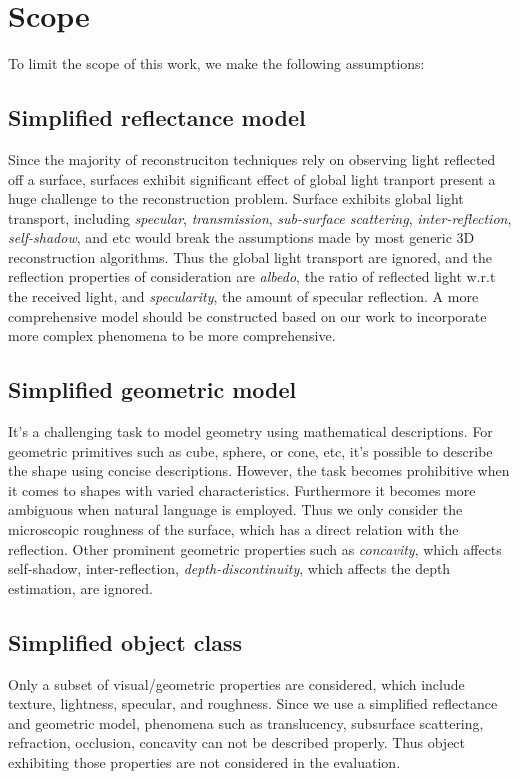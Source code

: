 \section{Scope}
To limit the scope of this work, we make the following assumptions:

\subsection{Simplified reflectance model}
Since the majority of reconstruciton techniques rely on observing light reflected off a surface, surfaces exhibit significant effect of global light tranport present a huge challenge to the reconstruction problem. Surface exhibits global light transport, including \textit{specular}, \textit{transmission}, \textit{sub-surface scattering}, \textit{inter-reflection}, \textit{self-shadow}, and etc would break the assumptions made by most generic 3D reconstruction algorithms. Thus the global light transport are ignored, and the reflection properties of consideration are \textit{albedo}, \ie the ratio of reflected light w.r.t the received light, and \textit{specularity}, \ie the amount of specular reflection. A more comprehensive model should be constructed based on our work to incorporate more complex phenomena to be more comprehensive.

\subsection{Simplified geometric model}
It's a challenging task to model geometry using mathematical descriptions. For geometric primitives such as cube, sphere, or cone, etc, it's possible to describe the shape using concise descriptions. However, the task becomes prohibitive when it comes to shapes with varied characteristics. Furthermore it becomes more ambiguous when natural language is employed. Thus we only consider the microscopic roughness of the surface, which has a direct relation with the reflection. Other prominent geometric properties such as \textit{concavity}, which affects self-shadow, inter-reflection, \textit{depth-discontinuity}, which affects the depth estimation, are ignored.

\subsection{Simplified object class}
Only a subset of visual/geometric properties are considered, which include texture, lightness, specular, and roughness. Since we use a simplified reflectance and geometric model, phenomena such as translucency, subsurface scattering, refraction, occlusion, concavity can not be described properly. Thus object exhibiting those properties are not considered in the evaluation.

